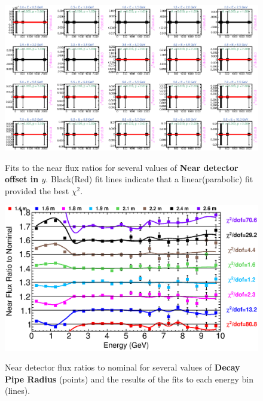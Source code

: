 {\begin{figure}[ht]
  \begin{center}
    {\includegraphics[width=5.0in]{figures/LBNEFDY_near_fits.eps}}
  \end{center}
\caption{ Fits to the near flux ratios for several values of {\bf Near detector offset in $y$}. Black(Red) fit lines indicate that a linear(parabolic) fit provided the best $\chi^2$. }
\end{figure}

\begin{figure}[ht]
  \begin{center}
    {\includegraphics[width=6.0in]{figures/DecayPipeRadius_near_summary.eps}}
  \end{center}
\caption{ Near detector flux ratios to nominal for several values of {\bf Decay Pipe Radius} (points) and the results of the fits to each energy bin (lines).}
\end{figure}

}
